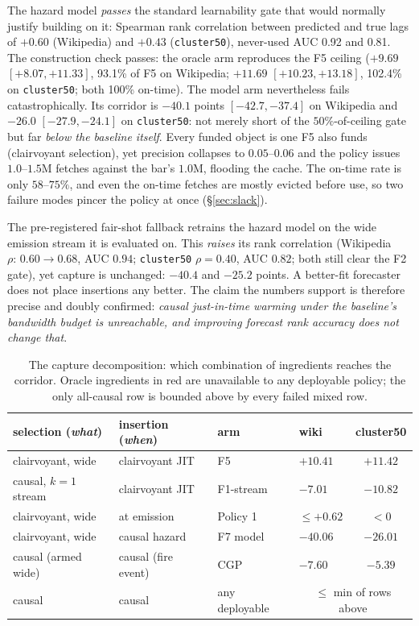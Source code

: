 \documentclass[11pt]{article}
\begin{document}
The hazard model \emph{passes} the standard learnability gate that would normally justify building on it: Spearman rank correlation between predicted and true lags of $+0.60$ (Wikipedia) and $+0.43$ (\texttt{cluster50}), never-used AUC 0.92 and 0.81. The construction check passes: the oracle arm reproduces the F5 ceiling ($+9.69$ $[+8.07,+11.33]$, 93.1\% of F5 on Wikipedia; $+11.69$ $[+10.23,+13.18]$, 102.4\% on \texttt{cluster50}; both 100\% on-time). The model arm nevertheless fails catastrophically. Its corridor is $-40.1$ points $[-42.7,-37.4]$ on Wikipedia and $-26.0$ $[-27.9,-24.1]$ on \texttt{cluster50}: not merely short of the $50\%$-of-ceiling gate but far \emph{below the baseline itself}. Every funded object is one F5 also funds (clairvoyant selection), yet precision collapses to $0.05$--$0.06$ and the policy issues $1.0$--$1.5$M fetches against the bar's $1.0$M, flooding the cache. The on-time rate is only $58$--$75\%$, and even the on-time fetches are mostly evicted before use, so two failure modes pincer the policy at once (\S\ref{sec:slack}).

The pre-registered fair-shot fallback retrains the hazard model on the wide emission stream it is evaluated on. This \emph{raises} its rank correlation (Wikipedia $\rho{:}\,0.60{\to}0.68$, AUC $0.94$; \texttt{cluster50} $\rho{=}0.40$, AUC $0.82$; both still clear the F2 gate), yet capture is unchanged: $-40.4$ and $-25.2$ points. A better-fit forecaster does not place insertions any better. The claim the numbers support is therefore precise and doubly confirmed: \emph{causal just-in-time warming under the baseline's bandwidth budget is unreachable, and improving forecast rank accuracy does not change that}.

\begin{table}[t]\centering\footnotesize
\setlength{\tabcolsep}{4pt}
\caption{The capture decomposition: which combination of ingredients reaches the corridor. Oracle ingredients in \textcolor{dead}{red} are unavailable to any deployable policy; the only all-causal row is bounded above by every failed mixed row.}
\label{tab:decomp}
\begin{tabular}{llllc}
\toprule
selection (\emph{what}) & insertion (\emph{when}) & arm & wiki & cluster50 \\
\midrule
\textcolor{dead}{clairvoyant, wide} & \textcolor{dead}{clairvoyant JIT} & F5 & $+10.41$ & $+11.42$ \\
causal, $k{=}1$ stream & \textcolor{dead}{clairvoyant JIT} & F1-stream & $-7.01$ & $-10.82$ \\
\textcolor{dead}{clairvoyant, wide} & at emission & Policy 1 & $\leq+0.62$ & $<0$ \\
\textcolor{dead}{clairvoyant, wide} & causal hazard & F7 model & $-40.06$ & $-26.01$ \\
causal (armed wide) & causal (fire event) & CGP & $-7.60$ & $-5.39$ \\
causal & causal & any deployable & \multicolumn{2}{c}{$\leq$ min of rows above} \\
\bottomrule
\end{tabular}
\end{table}
\end{document}
